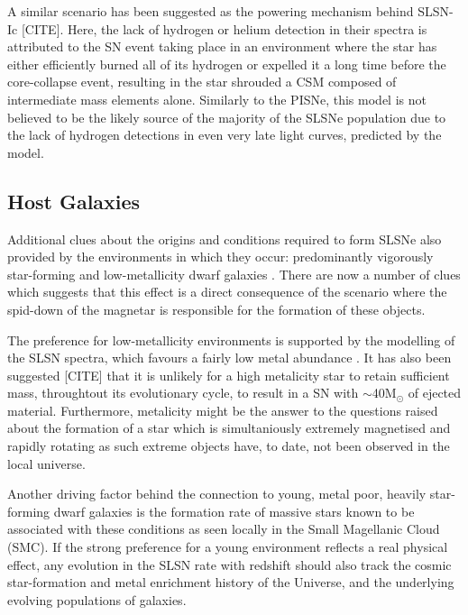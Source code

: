A similar scenario has been suggested as the powering mechanism behind SLSN-Ic [CITE]. Here, the lack of hydrogen or helium detection in their spectra is attributed to the SN event taking place in an environment where the star has either efficiently burned all of its hydrogen or expelled it a long time before the core-collapse event, resulting in the star shrouded a CSM composed of intermediate mass elements alone. Similarly to the PISNe, this model is not believed to be the likely source of the majority of the SLSNe population due to the lack of hydrogen detections in even very late light curves, predicted by the model.

\subsection{Host Galaxies}
Additional clues about the origins and conditions required to form SLSNe also provided by the environments in which they occur: predominantly vigorously star-forming and low-metallicity dwarf galaxies \citep[e.g.,][]{Lunnan2014,Leloudas2015,Angus2016}. There are now a number of clues which suggests that this effect is a direct consequence of the scenario where the spid-down of the magnetar is responsible for the formation of these objects.

The preference for low-metallicity environments is supported by the modelling of the SLSN spectra, which favours a fairly low metal abundance \citep{Mazzali2015}. It has also been suggested [CITE] that it is unlikely for a high metalicity star to retain sufficient mass, throughtout its evolutionary cycle, to result in a SN with $\sim$40M$_{\odot}$ of ejected material. Furthermore, metalicity might be the answer to the questions raised about the formation of a star which is simultaniously extremely magnetised and rapidly rotating as such extreme objects have, to date, not been observed in the local universe.

Another driving factor behind the connection to young, metal poor, heavily star-forming dwarf galaxies is the formation rate of massive stars known to be associated with these conditions as seen locally in the Small Magellanic Cloud (SMC). If the strong preference for a young environment reflects a real physical effect, any evolution in the SLSN rate with redshift should also track the cosmic star-formation and metal enrichment history of the Universe, and the underlying evolving populations of galaxies.

